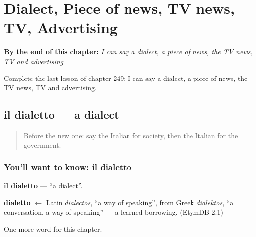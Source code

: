 
\chapter{Dialect, Piece of news, TV news, TV, Advertising}
\label{ch:it-dialect-piece-of-news-tv-news-tv-advertising}

\begin{chapteropening}
\textbf{By the end of this chapter:} \emph{I can say a dialect, a piece of news, the TV news, TV and advertising.}

Complete the last lesson of chapter 249: I can say a dialect, a piece of news, the TV news, TV and advertising.
\end{chapteropening}

\section[il dialetto]{il dialetto — a dialect}

\label{lesson:IT-C249-dialetto}



\begin{quote}
Before the new one: say the Italian for society, then the Italian for the government.
\end{quote}

\subsection*{You'll want to know: il dialetto}
\textbf{il dialetto} — \textquotedblleft{}a dialect\textquotedblright{}.

\begin{cousinweb}
\textbf{dialetto} $\leftarrow$ Latin \emph{dialectos}, \textquotedblleft{}a way of speaking\textquotedblright{}, from Greek \emph{dialektos}, \textquotedblleft{}a conversation, a way of speaking\textquotedblright{} — a learned borrowing. (EtymDB 2.1)
\end{cousinweb}

\begin{grammarlens}[title={What you've built}]
One more word for this chapter.
\end{grammarlens}

